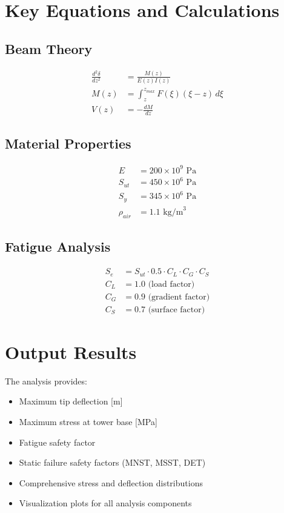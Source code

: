 \documentclass[11pt]{article}
\begin{document}
\section{Key Equations and Calculations}

\subsection{Beam Theory}
\begin{align}
\frac{d^2\delta}{dz^2} &= \frac{M(z)}{E(z)I(z)} \\
M(z) &= \int_z^{z_{max}} F(\xi)(\xi - z) \, d\xi \\
V(z) &= -\frac{dM}{dz}
\end{align}

\subsection{Material Properties}
\begin{align}
E &= 200 \times 10^9 \text{ Pa} \\
S_{ut} &= 450 \times 10^6 \text{ Pa} \\
S_y &= 345 \times 10^6 \text{ Pa} \\
\rho_{air} &= 1.1 \text{ kg/m}^3
\end{align}

\subsection{Fatigue Analysis}
\begin{align}
S_e &= S_{ut} \cdot 0.5 \cdot C_L \cdot C_G \cdot C_S \\
C_L &= 1.0 \text{ (load factor)} \\
C_G &= 0.9 \text{ (gradient factor)} \\
C_S &= 0.7 \text{ (surface factor)}
\end{align}

\section{Output Results}
The analysis provides:
\begin{itemize}
    \item Maximum tip deflection [m]
    \item Maximum stress at tower base [MPa]
    \item Fatigue safety factor
    \item Static failure safety factors (MNST, MSST, DET)
    \item Comprehensive stress and deflection distributions
    \item Visualization plots for all analysis components
\end{itemize}
\end{document}
